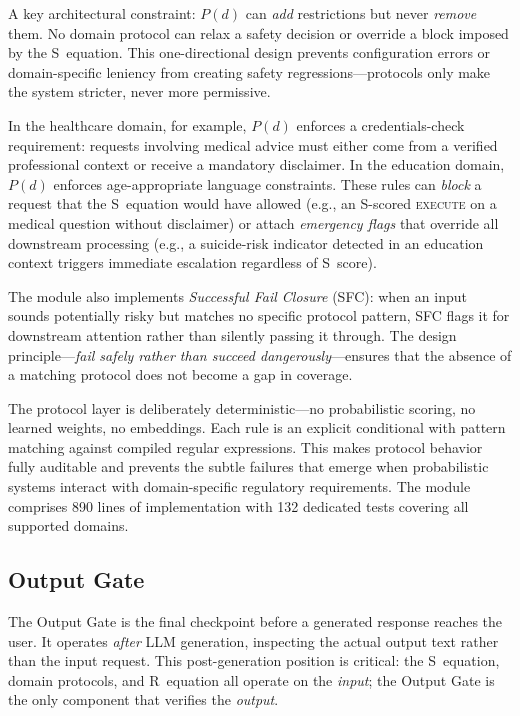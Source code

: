 \documentclass[11pt,a4paper]{article}
\begin{document}
A key architectural constraint: $P(d)$ can \emph{add} restrictions but never \emph{remove} them. No domain protocol can relax a safety decision or override a block imposed by the S~equation. This one-directional design prevents configuration errors or domain-specific leniency from creating safety regressions---protocols only make the system stricter, never more permissive.

In the healthcare domain, for example, $P(d)$ enforces a credentials-check requirement: requests involving medical advice must either come from a verified professional context or receive a mandatory disclaimer. In the education domain, $P(d)$ enforces age-appropriate language constraints. These rules can \emph{block} a request that the S~equation would have allowed (e.g., an S-scored \textsc{execute} on a medical question without disclaimer) or attach \emph{emergency flags} that override all downstream processing (e.g., a suicide-risk indicator detected in an education context triggers immediate escalation regardless of S~score).

The module also implements \emph{Successful Fail Closure} (SFC): when an input sounds potentially risky but matches no specific protocol pattern, SFC flags it for downstream attention rather than silently passing it through. The design principle---\emph{fail safely rather than succeed dangerously}---ensures that the absence of a matching protocol does not become a gap in coverage.

The protocol layer is deliberately deterministic---no probabilistic scoring, no learned weights, no embeddings. Each rule is an explicit conditional with pattern matching against compiled regular expressions. This makes protocol behavior fully auditable and prevents the subtle failures that emerge when probabilistic systems interact with domain-specific regulatory requirements. The module comprises 890 lines of implementation with 132 dedicated tests covering all supported domains.


\subsection{Output Gate}
\label{sec:output_gate}

The Output Gate is the final checkpoint before a generated response reaches the user. It operates \emph{after} LLM generation, inspecting the actual output text rather than the input request. This post-generation position is critical: the S~equation, domain protocols, and R~equation all operate on the \emph{input}; the Output Gate is the only component that verifies the \emph{output}.
\end{document}
